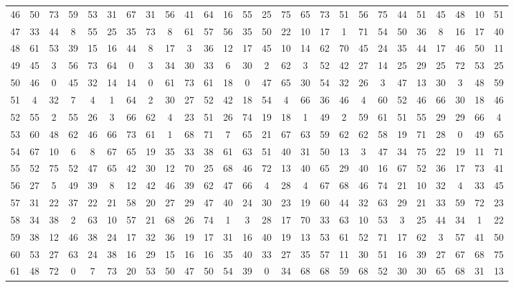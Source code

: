 \begin{table}
\begin{tabular}{c c c c c c c c c c c c c c c c c c c c c c c c c c }
46 & 50 & 73 & 59 & 53 & 31 & 67 & 31 & 56 & 41 & 64 & 16 & 55 & 25 & 75 & 65 & 73 & 51 & 56 & 75 & 44 & 51 & 45 & 48 & 10 & 51 \\
47 & 33 & 44 & 8 & 55 & 25 & 35 & 73 & 8 & 61 & 57 & 56 & 35 & 50 & 22 & 10 & 17 & 1 & 71 & 54 & 50 & 36 & 8 & 16 & 17 & 40 \\
48 & 61 & 53 & 39 & 15 & 16 & 44 & 8 & 17 & 3 & 36 & 12 & 17 & 45 & 10 & 14 & 62 & 70 & 45 & 24 & 35 & 44 & 17 & 46 & 50 & 11 \\
49 & 45 & 3 & 56 & 73 & 64 & 0 & 3 & 34 & 30 & 33 & 6 & 30 & 2 & 62 & 3 & 52 & 42 & 27 & 14 & 25 & 29 & 25 & 72 & 53 & 25 \\
50 & 46 & 0 & 45 & 32 & 14 & 14 & 0 & 61 & 73 & 61 & 18 & 0 & 47 & 65 & 30 & 54 & 32 & 26 & 3 & 47 & 13 & 30 & 3 & 48 & 59 \\
51 & 4 & 32 & 7 & 4 & 1 & 64 & 2 & 30 & 27 & 52 & 42 & 18 & 54 & 4 & 66 & 36 & 46 & 4 & 60 & 52 & 46 & 66 & 30 & 18 & 46 \\
52 & 55 & 2 & 55 & 26 & 3 & 66 & 62 & 4 & 23 & 51 & 26 & 74 & 19 & 18 & 1 & 49 & 2 & 59 & 61 & 51 & 55 & 29 & 29 & 66 & 4 \\
53 & 60 & 48 & 62 & 46 & 66 & 73 & 61 & 1 & 68 & 71 & 7 & 65 & 21 & 67 & 63 & 59 & 62 & 62 & 58 & 19 & 71 & 28 & 0 & 49 & 65 \\
54 & 67 & 10 & 6 & 8 & 67 & 65 & 19 & 35 & 33 & 38 & 61 & 63 & 51 & 40 & 31 & 50 & 13 & 3 & 47 & 34 & 75 & 22 & 19 & 11 & 71 \\
55 & 52 & 75 & 52 & 47 & 65 & 42 & 30 & 12 & 70 & 25 & 68 & 46 & 72 & 13 & 40 & 65 & 29 & 40 & 16 & 67 & 52 & 36 & 17 & 73 & 41 \\
56 & 27 & 5 & 49 & 39 & 8 & 12 & 42 & 46 & 39 & 62 & 47 & 66 & 4 & 28 & 4 & 67 & 68 & 46 & 74 & 21 & 10 & 32 & 4 & 33 & 45 \\
57 & 31 & 22 & 37 & 22 & 21 & 58 & 20 & 27 & 29 & 47 & 40 & 24 & 30 & 23 & 19 & 60 & 44 & 32 & 63 & 29 & 21 & 33 & 59 & 72 & 23 \\
58 & 34 & 38 & 2 & 63 & 10 & 57 & 21 & 68 & 26 & 74 & 1 & 3 & 28 & 17 & 70 & 33 & 63 & 10 & 53 & 3 & 25 & 44 & 34 & 1 & 22 \\
59 & 38 & 12 & 46 & 38 & 24 & 17 & 32 & 36 & 19 & 17 & 31 & 16 & 40 & 19 & 13 & 53 & 61 & 52 & 71 & 17 & 62 & 3 & 57 & 41 & 50 \\
60 & 53 & 27 & 63 & 24 & 38 & 16 & 29 & 15 & 16 & 16 & 35 & 40 & 33 & 27 & 35 & 57 & 11 & 30 & 51 & 16 & 39 & 27 & 67 & 68 & 75 \\
61 & 48 & 72 & 0 & 7 & 73 & 20 & 53 & 50 & 47 & 50 & 54 & 39 & 0 & 34 & 68 & 68 & 59 & 68 & 52 & 30 & 30 & 65 & 68 & 31 & 13 \\

\end{tabular}
\end{table}

